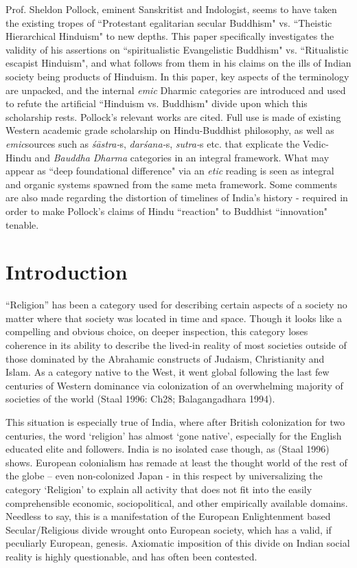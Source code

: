Prof. Sheldon Pollock, eminent Sanskritist and Indologist, seems to have taken the existing tropes of ``Protestant egalitarian secular Buddhism" vs. ``Theistic Hierarchical Hinduism" to new depths. This paper specifically investigates the validity of his assertions on ``spiritualistic Evangelistic Buddhism" vs. ``Ritualistic escapist Hinduism", and what follows from them in his claims on the ills of Indian society being products of Hinduism. In this paper, key aspects of the terminology are unpacked, and the internal \textit{emic} Dharmic categories are introduced and used to refute the artificial ``Hinduism vs. Buddhism" divide upon which this scholarship rests. Pollock's relevant works are cited. Full use is made of existing Western academic grade scholarship on Hindu-Buddhist philosophy, as well as \textit{emic}sources such as \textit{śāstra-}s, \textit{darśana-}s, \textit{sutra-}s etc. that explicate the Vedic-Hindu and \textit{Bauddha Dharma} categories in an integral framework. What may appear as ``deep foundational difference" via an \textit{etic} reading is seen as integral and organic systems spawned from the same meta framework. Some comments are also made regarding the distortion of timelines of India's history - required in order to make Pollock's claims of Hindu ``reaction" to Buddhist ``innovation" tenable.


\section*{Introduction}

“Religion” has been a category used for describing certain aspects of a society no matter where that society was located in time and space. Though it looks like a compelling and obvious choice, on deeper inspection, this category loses coherence in its ability to describe the lived-in reality of most societies outside of those dominated by the Abrahamic constructs of Judaism, Christianity and Islam. As a category native to the West, it went global following the last few centuries of Western dominance via colonization of an overwhelming majority of societies of the world (Staal 1996: Ch28; Balagangadhara 1994).

This situation is especially true of India, where after British colonization for two centuries, the word ‘religion’ has almost ‘gone native’, especially for the English educated elite and followers. India is no isolated case though, as (Staal 1996) shows. European colonialism has remade at least the thought world of the rest of the globe – even non-colonized Japan - in this respect by universalizing the category ‘Religion’ to explain all activity that does not fit into the easily comprehensible economic, sociopolitical, and other empirically available domains. Needless to say, this is a manifestation of the European Enlightenment based Secular/Religious divide wrought onto European society, which has a valid, if peculiarly European, genesis. Axiomatic imposition of this divide on Indian social reality is highly questionable, and has often been contested.


